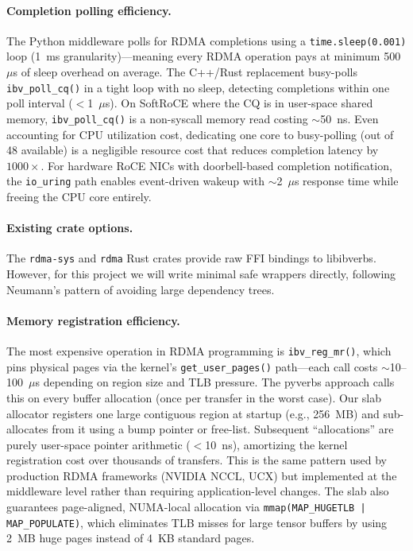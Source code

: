 \documentclass[11pt,letterpaper]{article}
\begin{document}
\paragraph{Completion polling efficiency.}
The Python middleware polls for RDMA completions using a \texttt{time.sleep(0.001)} loop (1~ms granularity)---meaning every RDMA operation pays at minimum 500~$\mu$s of sleep overhead on average. The C++/Rust replacement busy-polls \texttt{ibv\_poll\_cq()} in a tight loop with no sleep, detecting completions within one poll interval ($<$1~$\mu$s). On SoftRoCE where the CQ is in user-space shared memory, \texttt{ibv\_poll\_cq()} is a non-syscall memory read costing ${\sim}$50~ns. Even accounting for CPU utilization cost, dedicating one core to busy-polling (out of 48 available) is a negligible resource cost that reduces completion latency by $1000\times$. For hardware RoCE NICs with doorbell-based completion notification, the \texttt{io\_uring} path enables event-driven wakeup with ${\sim}$2~$\mu$s response time while freeing the CPU core entirely.

\paragraph{Existing crate options.}
The \texttt{rdma-sys} and \texttt{rdma} Rust crates provide raw FFI bindings to libibverbs. However, for this project we will write minimal safe wrappers directly, following Neumann's pattern of avoiding large dependency trees.

\paragraph{Memory registration efficiency.}
The most expensive operation in RDMA programming is \texttt{ibv\_reg\_mr()}, which pins physical pages via the kernel's \texttt{get\_user\_pages()} path---each call costs ${\sim}$10--100~$\mu$s depending on region size and TLB pressure. The pyverbs approach calls this on every buffer allocation (once per transfer in the worst case). Our slab allocator registers one large contiguous region at startup (e.g., 256~MB) and sub-allocates from it using a bump pointer or free-list. Subsequent ``allocations'' are purely user-space pointer arithmetic ($<$10~ns), amortizing the kernel registration cost over thousands of transfers. This is the same pattern used by production RDMA frameworks (NVIDIA NCCL, UCX) but implemented at the middleware level rather than requiring application-level changes. The slab also guarantees page-aligned, NUMA-local allocation via \texttt{mmap(MAP\_HUGETLB | MAP\_POPULATE)}, which eliminates TLB misses for large tensor buffers by using 2~MB huge pages instead of 4~KB standard pages.
\end{document}

